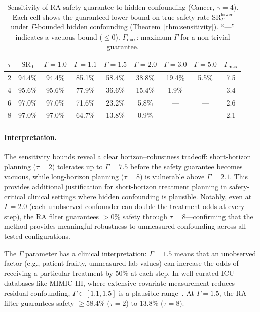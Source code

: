 \documentclass{article}
\begin{document}
\begin{table}[h]
\centering
\caption{Sensitivity of RA safety guarantee to hidden confounding (Cancer, $\gamma = 4$). Each cell shows the guaranteed lower bound on true safety rate $\mathrm{SR}_\Gamma^{\mathrm{lower}}$ under $\Gamma$-bounded hidden confounding (Theorem~\ref{thm:sensitivity}). ``---'' indicates a vacuous bound ($\leq 0$). $\Gamma_{\max}$: maximum $\Gamma$ for a non-trivial guarantee.}
\label{tab:sensitivity}
\small
\begin{tabular}{cc cccccc c}
\toprule
$\tau$ & $\mathrm{SR}_0$ & $\Gamma{=}1.0$ & $\Gamma{=}1.1$ & $\Gamma{=}1.5$ & $\Gamma{=}2.0$ & $\Gamma{=}3.0$ & $\Gamma{=}5.0$ & $\Gamma_{\max}$ \\
\midrule
2 & 94.4\% & 94.4\% & 85.1\% & 58.4\% & 38.8\% & 19.4\% & 5.5\% & 7.5 \\
4 & 95.6\% & 95.6\% & 77.9\% & 36.6\% & 15.4\% & 1.9\% & --- & 3.4 \\
6 & 97.0\% & 97.0\% & 71.6\% & 23.2\% & 5.8\% & --- & --- & 2.6 \\
8 & 97.0\% & 97.0\% & 64.7\% & 13.8\% & 0.9\% & --- & --- & 2.1 \\
\bottomrule
\end{tabular}
\end{table}

\paragraph{Interpretation.} The sensitivity bounds reveal a clear horizon--robustness tradeoff: short-horizon planning ($\tau = 2$) tolerates up to $\Gamma = 7.5$ before the safety guarantee becomes vacuous, while long-horizon planning ($\tau = 8$) is vulnerable above $\Gamma = 2.1$. This provides additional justification for short-horizon treatment planning in safety-critical clinical settings where hidden confounding is plausible. Notably, even at $\Gamma = 2.0$ (each unobserved confounder can double the treatment odds at every step), the RA filter guarantees $> 0\%$ safety through $\tau = 8$---confirming that the method provides meaningful robustness to unmeasured confounding across all tested configurations.

The $\Gamma$ parameter has a clinical interpretation: $\Gamma = 1.5$ means that an unobserved factor (e.g., patient frailty, unmeasured lab values) can increase the odds of receiving a particular treatment by 50\% at each step. In well-curated ICU databases like MIMIC-III, where extensive covariate measurement reduces residual confounding, $\Gamma \in [1.1, 1.5]$ is a plausible range~\citep{frauen2023sharp}. At $\Gamma = 1.5$, the RA filter guarantees safety $\geq 58.4\%$ ($\tau = 2$) to $13.8\%$ ($\tau = 8$).
\end{document}
